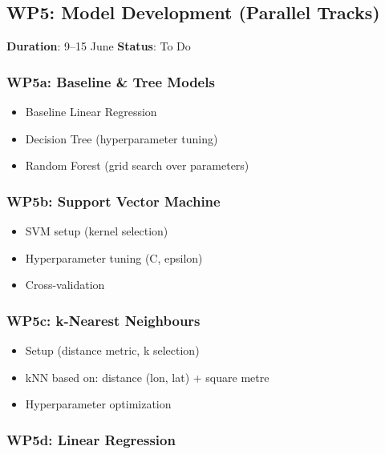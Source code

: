 \documentclass[
  english,
  letterpaper,
  DIV=11,
  numbers=noendperiod]{scrreprt}
\providecommand{\tightlist}{%
  \setlength{\itemsep}{0pt}\setlength{\parskip}{0pt}}
\begin{document}
\subsection{WP5: Model Development (Parallel
Tracks)}\label{wp5-model-development-parallel-tracks}

\textbf{Duration}: 9--15 June \textbar{} \textbf{Status}: To Do

\subsubsection{WP5a: Baseline \& Tree
Models}\label{wp5a-baseline-tree-models}

\begin{itemize}
\tightlist
\item
  Baseline Linear Regression
\item
  Decision Tree (hyperparameter tuning)
\item
  Random Forest (grid search over parameters)
\end{itemize}

\subsubsection{WP5b: Support Vector
Machine}\label{wp5b-support-vector-machine}

\begin{itemize}
\tightlist
\item
  SVM setup (kernel selection)
\item
  Hyperparameter tuning (C, epsilon)
\item
  Cross-validation
\end{itemize}

\subsubsection{WP5c: k-Nearest
Neighbours}\label{wp5c-k-nearest-neighbours}

\begin{itemize}
\tightlist
\item
  Setup (distance metric, k selection)
\item
  kNN based on: distance (lon, lat) + square metre
\item
  Hyperparameter optimization
\end{itemize}

\subsubsection{WP5d: Linear Regression}\label{wp5d-linear-regression}
\end{document}
